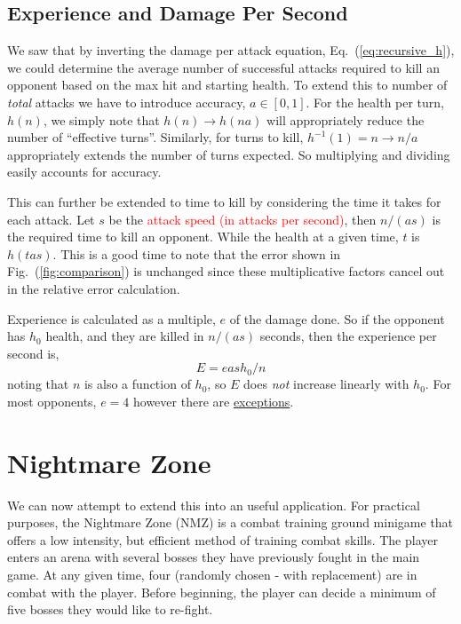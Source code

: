 \documentclass[../../main.tex]{subfiles}
\begin{document}
		\subsection{Experience and Damage Per Second}
			We saw that by inverting the damage per attack equation, Eq.~(\ref{eq:recursive_h}), we could determine the average number of successful attacks required to kill an opponent based on the max hit and starting health. To extend this to number of \textit{total} attacks we have to introduce accuracy, $a\in[0, 1]$. For the health per turn, $h(n)$, we simply note that $h(n)\to h(na)$ will appropriately reduce the number of ``effective turns''. Similarly, for turns to kill, $h^{-1}(1)=n\to n/a$ appropriately extends the number of turns expected. So multiplying and dividing easily accounts for accuracy.

			This can further be extended to time to kill by considering the time it takes for each attack. Let $s$ be the \textcolor{red}{attack speed (in attacks per second)}, then $n/(as)$ is the required time to kill an opponent. While the health at a given time, $t$ is $h(tas)$. This is a good time to note that the error shown in Fig.~(\ref{fig:comparison}) is unchanged since these multiplicative factors cancel out in the relative error calculation.

			Experience is calculated as a multiple, $e$ of the damage done. So if the opponent has $h_0$ health, and they are killed in $n/(as)$ seconds, then the experience per second is,
			\begin{equation}
				\boxed{E=eash_0/n}
			\end{equation}
			noting that $n$ is also a function of $h_0$, so $E$ does \emph{not} increase linearly with $h_0$. For most opponents, $e=4$ however there are \href{https://twitter.com/BitterkoekjeRS/status/803960032178110468}{exceptions}.

	\section{Nightmare Zone}
		We can now attempt to extend this into an useful application. For practical purposes, the Nightmare Zone (NMZ) is a combat training ground minigame that offers a low intensity, but efficient method of training combat skills. The player enters an arena with several bosses they have previously fought in the main game. At any given time, four (randomly chosen - with replacement) are in combat with the player. Before beginning, the player can decide a minimum of five bosses they would like to re-fight.
\end{document}
